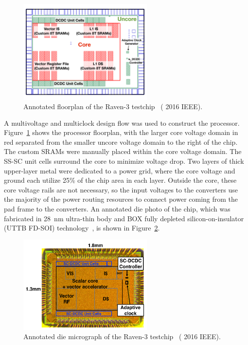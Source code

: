 \documentclass[graybox]{svmult}
\begin{document}
\begin{figure}
  \centering
  \includegraphics[width=0.6\textwidth]{6-raven3-floorplan}
  \caption{Annotated floorplan of the Raven-3 testchip~\cite{Zimmer2016} ({\textcopyright} 2016 IEEE).}
  \label{fig:6-raven3-floorplan}
\end{figure}

A multivoltage and multiclock design flow was used to construct the processor.
Figure~\ref{fig:6-raven3-floorplan} shows the processor floorplan, with the larger core voltage domain in red separated from the smaller uncore voltage domain to the right of the chip.
The custom SRAMs were manually placed within the core voltage domain.
The SS-SC unit cells surround the core to minimize voltage drop.
Two layers of thick upper-layer metal were dedicated to a power grid, where the core voltage and ground each utilize 25\% of the chip area in each layer.
Outside the core, these core voltage rails are not necessary, so the input voltages to the converters use the majority of the power routing resources to connect power coming from the pad frame to the converters.
An annotated die photo of the chip, which was fabricated in \SI{28}{\nano\meter} ultra-thin body and BOX fully depleted silicon-on-insulator (UTTB FD-SOI) technology~\cite{Flatresse2013}, is shown in Figure~\ref{fig:6-raven3-diephoto}.

\begin{figure}
  \centering
  \includegraphics[width=0.6\textwidth]{6-raven3-diephoto}
  \caption{Annotated die micrograph of the Raven-3 testchip~\cite{Zimmer2016} ({\textcopyright} 2016 IEEE).}
  \label{fig:6-raven3-diephoto}
\end{figure}
\end{document}

